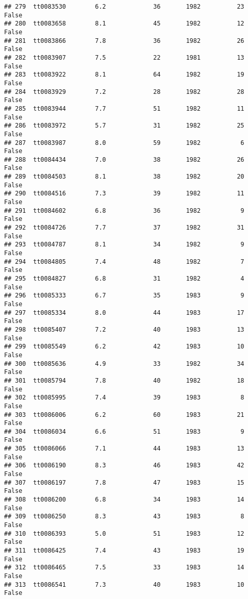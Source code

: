 \documentclass[
]{article}
\begin{document}
\begin{verbatim}
## 279  tt0083530        6.2             36       1982          23   False
## 280  tt0083658        8.1             45       1982          12   False
## 281  tt0083866        7.8             36       1982          26   False
## 282  tt0083907        7.5             22       1981          13   False
## 283  tt0083922        8.1             64       1982          19   False
## 284  tt0083929        7.2             28       1982          28   False
## 285  tt0083944        7.7             51       1982          11   False
## 286  tt0083972        5.7             31       1982          25   False
## 287  tt0083987        8.0             59       1982           6   False
## 288  tt0084434        7.0             38       1982          26   False
## 289  tt0084503        8.1             38       1982          20   False
## 290  tt0084516        7.3             39       1982          11   False
## 291  tt0084602        6.8             36       1982           9   False
## 292  tt0084726        7.7             37       1982          31   False
## 293  tt0084787        8.1             34       1982           9   False
## 294  tt0084805        7.4             48       1982           7   False
## 295  tt0084827        6.8             31       1982           4   False
## 296  tt0085333        6.7             35       1983           9   False
## 297  tt0085334        8.0             44       1983          17   False
## 298  tt0085407        7.2             40       1983          13   False
## 299  tt0085549        6.2             42       1983          10   False
## 300  tt0085636        4.9             33       1982          34   False
## 301  tt0085794        7.8             40       1982          18   False
## 302  tt0085995        7.4             39       1983           8   False
## 303  tt0086006        6.2             60       1983          21   False
## 304  tt0086034        6.6             51       1983           9   False
## 305  tt0086066        7.1             44       1983          13   False
## 306  tt0086190        8.3             46       1983          42   False
## 307  tt0086197        7.8             47       1983          15   False
## 308  tt0086200        6.8             34       1983          14   False
## 309  tt0086250        8.3             43       1983           8   False
## 310  tt0086393        5.0             51       1983          12   False
## 311  tt0086425        7.4             43       1983          19   False
## 312  tt0086465        7.5             33       1983          14   False
## 313  tt0086541        7.3             40       1983          10   False

\end{verbatim}
\end{document}
